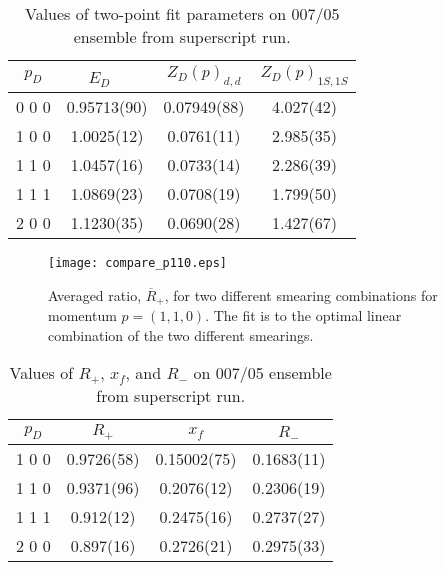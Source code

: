 \documentclass[11pt]{article}
\begin{document}
\begin{table}
\begin{center}
\caption{Values of two-point fit parameters on 007/05 ensemble from superscript run.}
 \label{tab:params}
\begin{tabular}{cccc}
  \hline \hline
  $p_D$ & $E_D$  \ & $Z_{D}(p)_{d,d}$  & $Z_{D}(p)_{1S,1S}$ \\
  \hline
  0 0 0  & 0.95713(90) & 0.07949(88) & 4.027(42) \\
   1 0 0  & 1.0025(12) & 0.0761(11) & 2.985(35) \\
   1 1 0  & 1.0457(16) & 0.0733(14) & 2.286(39) \\
    1 1 1  & 1.0869(23) & 0.0708(19) & 1.799(50) \\
     2 0 0  & 1.1230(35) & 0.0690(28) & 1.427(67) \\
  \hline \hline
\end{tabular}
\end{center}
\end{table}




\begin{figure}
\begin{center}
 \texttt{[image: compare\_p110.eps]}
\end{center}
\caption{Averaged ratio, $\overline{R}_{+}$, for two different smearing combinations for momentum $p=(1,1,0)$.  The fit is to the optimal linear combination of the two different smearings.
\label{fig:Rplus_p110}}
\end{figure}


\begin{table}
\begin{center}
\caption{Values of $R_{+}$, $x_f$, and $R_-$ on 007/05 ensemble from superscript run.}
 \label{tab:Rplus}
\begin{tabular}{cccc}
  \hline \hline
  $p_D$ & $R_+$ & $x_f$ & $R_-$ \\
  \hline
     1 0 0  & 0.9726(58) & 0.15002(75)  & 0.1683(11) \\
   1 1 0  & 0.9371(96)  & 0.2076(12) & 0.2306(19)  \\
    1 1 1  & 0.912(12) & 0.2475(16) & 0.2737(27) \\
     2 0 0  & 0.897(16) & 0.2726(21) & 0.2975(33) \\
  \hline \hline
\end{tabular}
\end{center}
\end{table}
\end{document}
